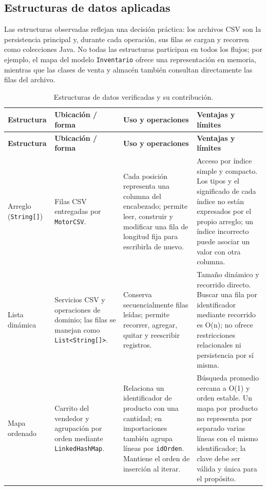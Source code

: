 \subsection{Estructuras de datos aplicadas}
\label{subsec:estructuras}

Las estructuras observadas reflejan una decisión práctica: los archivos CSV son la persistencia principal y, durante cada operación, sus filas se cargan y recorren como colecciones Java. No todas las estructuras participan en todos los flujos; por ejemplo, el mapa del modelo \texttt{Inventario} ofrece una representación en memoria, mientras que las clases de venta y almacén también consultan directamente las filas del archivo.

\begin{longtable}{|p{2.6cm}|p{3.3cm}|p{3.4cm}|p{3.3cm}|}
\caption{Estructuras de datos verificadas y su contribución.}
\label{tab:estructuras-datos}\\
\hline
\textbf{Estructura} & \textbf{Ubicación / forma} & \textbf{Uso y operaciones} & \textbf{Ventajas y límites}\\
\hline
\endfirsthead
\hline
\textbf{Estructura} & \textbf{Ubicación / forma} & \textbf{Uso y operaciones} & \textbf{Ventajas y límites}\\
\hline
\endhead
Arreglo (\texttt{String[]}) & Filas CSV entregadas por \texttt{MotorCSV}. & Cada posición representa una columna del encabezado; permite leer, construir y modificar una fila de longitud fija para escribirla de nuevo. & Acceso por índice simple y compacto. Los tipos y el significado de cada índice no están expresados por el propio arreglo; un índice incorrecto puede asociar un valor con otra columna.\\
\hline
Lista dinámica & Servicios CSV y operaciones de dominio; las filas se manejan como \texttt{List<String[]>}. & Conserva secuencialmente filas leídas; permite recorrer, agregar, quitar y reescribir registros. & Tamaño dinámico y recorrido directo. Buscar una fila por identificador mediante recorrido es O(n); no ofrece restricciones relacionales ni persistencia por sí misma.\\
\hline
Mapa ordenado & Carrito del vendedor y agrupación por orden mediante \texttt{LinkedHashMap}. & Relaciona un identificador de producto con una cantidad; en importaciones también agrupa líneas por \texttt{idOrden}. Mantiene el orden de inserción al iterar. & Búsqueda promedio cercana a O(1) y orden estable. Un mapa por producto no representa por separado varias líneas con el mismo identificador; la clave debe ser válida y única para el propósito.\\

\end{longtable}
